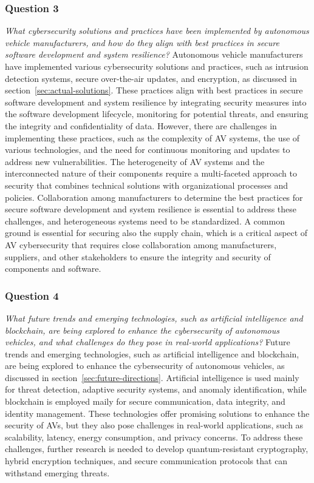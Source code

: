 \subsubsection{Question 3}
\textit{What cybersecurity solutions and practices have been implemented by autonomous vehicle manufacturers, and how do they align with best practices in secure software development and system resilience?}
Autonomous vehicle manufacturers have implemented various cybersecurity solutions and practices, such as intrusion detection systems, secure over-the-air updates, and encryption, as discussed in section~\ref{sec:actual-solutions}.
These practices align with best practices in secure software development and system resilience by integrating security measures into the software development lifecycle, monitoring for potential threats, and ensuring the integrity and confidentiality of data.
However, there are challenges in implementing these practices, such as the complexity of AV systems, the use of various technologies, and the need for continuous monitoring and updates to address new vulnerabilities.
The heterogeneity of AV systems and the interconnected nature of their components require a multi-faceted approach to security
that combines technical solutions with organizational processes and policies.
Collaboration among manufacturers to determine the best practices for secure software development and system resilience is essential to address these challenges, and heterogeneous systems need to be standardized.
A common ground is essential for securing also the supply chain, which is a critical aspect of AV cybersecurity that requires close collaboration among manufacturers, suppliers, and other stakeholders to ensure the integrity and security of components and software.

\subsubsection{Question 4}
\textit{What future trends and emerging technologies, such as artificial intelligence and blockchain, are being explored to enhance the cybersecurity of autonomous vehicles, and what challenges do they pose in real-world applications?}
Future trends and emerging technologies, such as artificial intelligence and blockchain, are being explored to enhance the cybersecurity of autonomous vehicles, as discussed in section~\ref{sec:future-directions}.
Artificial intelligence is used mainly for threat detection, adaptive security systems, and anomaly identification, while blockchain is employed maily for secure communication, data integrity, and identity management.
These technologies offer promising solutions to enhance the security of AVs, but they also pose challenges in real-world applications, such as scalability, latency, energy consumption, and privacy concerns.
To address these challenges, further research is needed to develop quantum-resistant cryptography, hybrid encryption techniques, and secure communication protocols that can withstand emerging threats.
